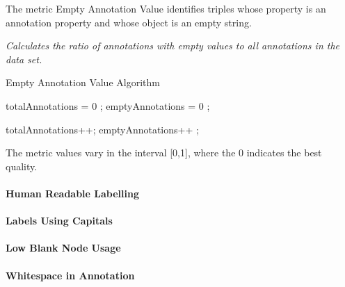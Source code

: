 The metric Empty Annotation Value identifies triples whose property is an annotation property and whose object is an empty string.
 
\begin{mdframed}[style=metricdefinition]
\emph{Calculates the ratio of annotations with empty values to all annotations in the data set.}
\end{mdframed}

\begin{algorithm}
\caption{Empty Annotation Value Algorithm}\label{lst:emptyAnnotationValue}
\begin{algorithmic}[1]
\State totalAnnotations = 0 ;
\State emptyAnnotations = 0 ;
\EndProcedure

 totalAnnotations++; \EndIf
{} emptyAnnotations++ ; \EndIf
{}
\EndProcedure
\end{algorithmic}
\end{algorithm}


The metric values vary in the interval [0,1], where  the 0 indicates the best quality.


\paragraph{Human Readable Labelling}
\paragraph{Labels Using Capitals}
\paragraph{Low Blank Node Usage}
\paragraph{Whitespace in Annotation}